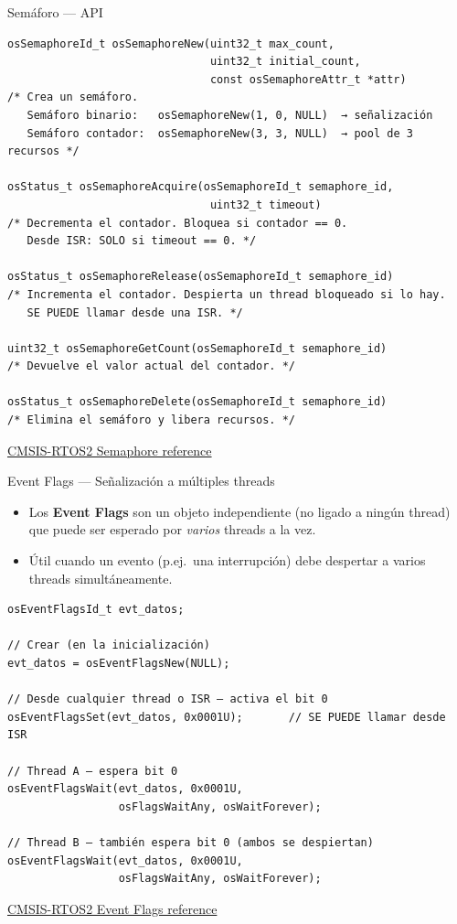 \begin{frame}[fragile]{Semáforo — API}
    \begin{verbatim}
osSemaphoreId_t osSemaphoreNew(uint32_t max_count,
                               uint32_t initial_count,
                               const osSemaphoreAttr_t *attr)
/* Crea un semáforo.
   Semáforo binario:   osSemaphoreNew(1, 0, NULL)  → señalización
   Semáforo contador:  osSemaphoreNew(3, 3, NULL)  → pool de 3 recursos */

osStatus_t osSemaphoreAcquire(osSemaphoreId_t semaphore_id,
                               uint32_t timeout)
/* Decrementa el contador. Bloquea si contador == 0.
   Desde ISR: SOLO si timeout == 0. */

osStatus_t osSemaphoreRelease(osSemaphoreId_t semaphore_id)
/* Incrementa el contador. Despierta un thread bloqueado si lo hay.
   SE PUEDE llamar desde una ISR. */

uint32_t osSemaphoreGetCount(osSemaphoreId_t semaphore_id)
/* Devuelve el valor actual del contador. */

osStatus_t osSemaphoreDelete(osSemaphoreId_t semaphore_id)
/* Elimina el semáforo y libera recursos. */
    \end{verbatim}
    \vspace{4pt}
    \href{https://arm-software.github.io/CMSIS_5/RTOS2/html/group__CMSIS__RTOS__SemaphoreMgmt.html}
    {CMSIS-RTOS2 Semaphore reference}
\end{frame}

\begin{frame}[fragile]{Event Flags — Señalización a múltiples threads}
    \begin{itemize}
        \item Los \textbf{Event Flags} son un objeto independiente (no
              ligado a ningún thread) que puede ser esperado por
              \emph{varios} threads a la vez.
        \item Útil cuando un evento (p.ej.\ una interrupción) debe
              despertar a varios threads simultáneamente.
    \end{itemize}
    \begin{verbatim}
osEventFlagsId_t evt_datos;

// Crear (en la inicialización)
evt_datos = osEventFlagsNew(NULL);

// Desde cualquier thread o ISR — activa el bit 0
osEventFlagsSet(evt_datos, 0x0001U);       // SE PUEDE llamar desde ISR

// Thread A — espera bit 0
osEventFlagsWait(evt_datos, 0x0001U,
                 osFlagsWaitAny, osWaitForever);

// Thread B — también espera bit 0 (ambos se despiertan)
osEventFlagsWait(evt_datos, 0x0001U,
                 osFlagsWaitAny, osWaitForever);
    \end{verbatim}
    \vspace{4pt}
    \href{https://arm-software.github.io/CMSIS_5/RTOS2/html/group__CMSIS__RTOS__EventFlags.html}
    {CMSIS-RTOS2 Event Flags reference}
\end{frame}